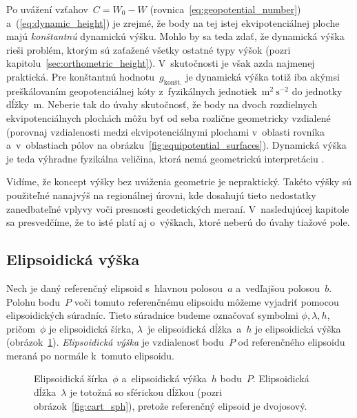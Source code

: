 \documentclass[a4paper, 12pt]{book}
\begin{document}
Po uvážení vzťahov~$C = W_0 - W$ (rovnica~\ref{eq:geopotential_number}) 
a~(\ref{eq:dynamic_height}) je zrejmé, že body na tej istej ekvipotenciálnej 
ploche majú \emph{konštantnú} dynamickú výšku.  Mohlo by sa teda zdať, že 
dynamická výška rieši problém, ktorým sú zaťažené všetky ostatné typy výšok 
(pozri kapitolu~\ref{sec:orthometric_height}).  V~skutočnosti je však azda 
najmenej praktická.  Pre konštantnú hodnotu~$g_{\textrm{konšt.}}$ je dynamická 
výška totiž iba akýmsi preškálovaním geopotenciálnej kóty z~fyzikálnych 
jednotiek~$\mathrm{m}^2 \ \mathrm{s}^{-2}$ do jednotky dĺžky~$\mathrm{m}$.  
Neberie tak do úvahy skutočnosť, že body na dvoch rozdielnych ekvipotenciálnych 
plochách môžu byť od seba rozlične geometricky vzdialené (porovnaj vzdialenosti 
medzi ekvipotenciálnymi plochami v~oblasti rovníka a~v~oblastiach pólov na 
obrázku~\ref{fig:equipotential_surfaces}).  Dynamická výška je teda výhradne 
fyzikálna veličina, ktorá nemá geometrickú interpretáciu 
\parencite{Jekeli2000a}.

Vidíme, že koncept výšky bez uváženia geometrie je nepraktický.  Takéto výšky 
sú použiteľné nanajvýš na regionálnej úrovni, kde dosahujú tieto nedostatky 
zanedbateľné vplyvy voči presnosti geodetických meraní.  V~nasledujúcej 
kapitole sa presvedčíme, že to isté platí aj o~výškach, ktoré neberú do úvahy 
tiažové pole.

\subsection{Elipsoidická výška}
\label{sec:ellipsoidal_height}

Nech je daný referenčný elipsoid s~hlavnou polosou~$a$ a~vedľajšou polosou~$b$.  
Polohu bodu~$P$ voči tomuto referenčnému elipsoidu môžeme vyjadriť pomocou 
elipsoidických súradníc.  Tieto súradnice budeme označovať symbolmi $\phi, 
\lambda, h$, pričom~$\phi$ je elipsoidická šírka, $\lambda$~je elipsoidická 
dĺžka~a~$h$ je elipsoidická výška (obrázok~\ref{fig:ell_coords}).  
\emph{Elipsoidická výška} je vzdialenosť bodu~$P$ od referenčného elipsoidu 
meraná po normále k~tomuto elipsoidu.

\begin{figure}[bt]
\centering

\caption{Elipsoidická šírka~$\phi$ a~elipsoidická výška~$h$ bodu~$P$.  
Elipsoidická dĺžka~$\lambda$ je totožná so sférickou dĺžkou (pozri 
obrázok~\ref{fig:cart_sph}), pretože referenčný elipsoid je dvojosový.}
\label{fig:ell_coords}
\end{figure}
\end{document}
